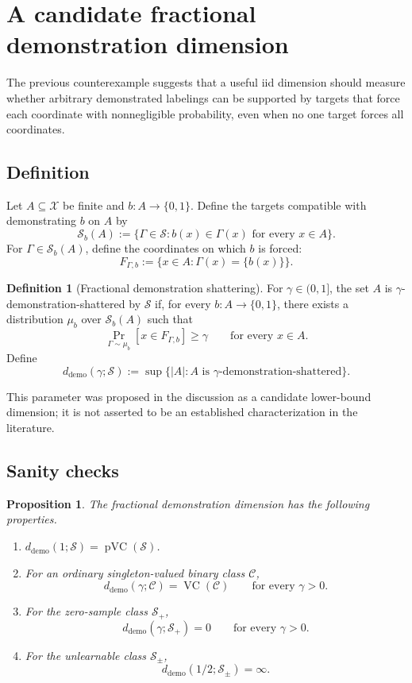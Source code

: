 \documentclass[11pt]{article}
\newtheorem{proposition}[theorem]{Proposition}
\theoremstyle{definition}
\newtheorem{definition}[theorem]{Definition}
\theoremstyle{remark}
\newcommand{\X}{\mathcal X}
\newcommand{\Y}{\{0,1\}}
\newcommand{\SV}{\mathcal S}
\newcommand{\pVC}{\operatorname{pVC}}
\newcommand{\ddemo}{d_{\mathrm{demo}}}
\newcommand{\1}{\mathbf 1}
\begin{document}
\section{A candidate fractional demonstration dimension}

The previous counterexample suggests that a useful iid dimension should measure whether arbitrary demonstrated labelings can be supported by targets that force each coordinate with nonnegligible probability, even when no one target forces all coordinates.

\subsection{Definition}

Let $A\subseteq\X$ be finite and $b:A\to\Y$. Define the targets compatible with demonstrating $b$ on $A$ by
\[
    \SV_b(A)
    :=
    \{\Gamma\in\SV:b(x)\in\Gamma(x)\text{ for every }x\in A\}.
\]
For $\Gamma\in\SV_b(A)$, define the coordinates on which $b$ is forced:
\[
    F_{\Gamma,b}
    :=
    \{x\in A:\Gamma(x)=\{b(x)\}\}.
\]

\begin{definition}[Fractional demonstration shattering]
For $\gamma\in(0,1]$, the set $A$ is $\gamma$-demonstration-shattered by $\SV$ if, for every $b:A\to\Y$, there exists a distribution $\mu_b$ over $\SV_b(A)$ such that
\[
    \Pr_{\Gamma\sim\mu_b}[x\in F_{\Gamma,b}]\geq\gamma
    \qquad\text{for every }x\in A.
\]
Define
\[
    \ddemo(\gamma;\SV)
    :=
    \sup\{|A|:A\text{ is }\gamma\text{-demonstration-shattered}\}.
\]
\end{definition}

This parameter was proposed in the discussion as a candidate lower-bound dimension; it is not asserted to be an established characterization in the literature.

\subsection{Sanity checks}

\begin{proposition}
The fractional demonstration dimension has the following properties.
\begin{enumerate}
    \item $\ddemo(1;\SV)=\pVC(\SV)$.
    \item For an ordinary singleton-valued binary class $\mathcal C$,
    \[
        \ddemo(\gamma;\mathcal C)=\operatorname{VC}(\mathcal C)
        \qquad\text{for every }\gamma>0.
    \]
    \item For the zero-sample class $\SV_+$,
    \[
        \ddemo(\gamma;\SV_+)=0
        \qquad\text{for every }\gamma>0.
    \]
    \item For the unlearnable class $\SV_{\pm}$,
    \[
        \ddemo(1/2;\SV_{\pm})=\infty.
    \]
\end{enumerate}
\end{proposition}
\end{document}
